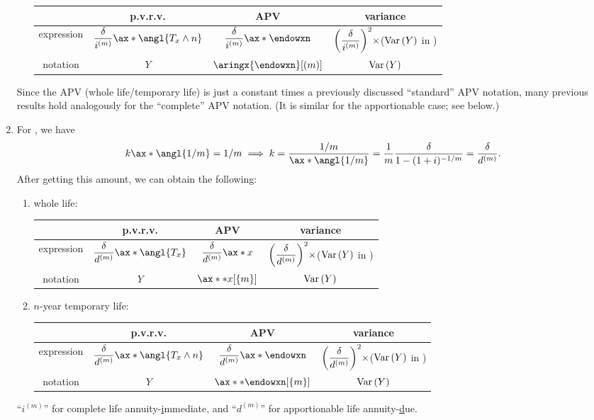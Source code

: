 \begin{enumerate}
\begin{enumerate}
\begin{tabular}{cccc}
\toprule
&p.v.r.v.&APV&variance\\
\midrule
expression&\(\displaystyle \frac{\delta}{i^{(m)}}\ax*{\angl{T_x\wedge n}}\)
&\(\displaystyle \frac{\delta}{i^{(m)}}\ax*{\endowxn}\)
&\(\displaystyle \qty(\frac{\delta}{i^{(m)}})^2\times\)(\(\operatorname{Var}\qty(Y)\) in {it:cts-tmp-annuity-fmlas})\\
notation&\(Y\)&\(\aringx{\endowxn}[(m)]\)&\(\operatorname{Var}\qty(Y)\)\\
\bottomrule
\end{tabular}
\end{enumerate}
\begin{note}
Since the APV (whole life/temporary life) is just a constant times a previously
discussed ``standard'' APV notation, many previous results hold analogously for
the ``complete'' APV notation.  (It is similar for the apportionable case; see
below.)
\end{note}

\item \label{it:apportionable-1m-annuity-fmlas}
For , we have
\[
k\ax*{\angl{1/m}}=1/m
\implies
k=\frac{1/m}{\ax*{\angl{1/m}}}
=\frac{1}{m}\frac{\delta}{1-(1+i)^{-1/m}}
=\frac{\delta}{d^{(m)}}.
\]
After getting this amount, we can obtain the following:
\begin{enumerate}
\item whole life:

\begin{tabular}{cccc}
\toprule
&p.v.r.v.&APV&variance\\
\midrule
expression&\(\displaystyle \frac{\delta}{d^{(m)}}\ax*{\angl{T_x}}\)
&\(\displaystyle \frac{\delta}{d^{(m)}}\ax*{x}\)
&\(\displaystyle \qty(\frac{\delta}{d^{(m)}})^2\times\)(\(\operatorname{Var}\qty(Y)\) in {it:cts-wl-annuity-fmlas})\\
notation&\(Y\)&\(\ax**{x}[\{m\}]\)&\(\operatorname{Var}\qty(Y)\)\\
\bottomrule
\end{tabular}

\item \(n\)-year temporary life:

\begin{tabular}{cccc}
\toprule
&p.v.r.v.&APV&variance\\
\midrule
expression&\(\displaystyle \frac{\delta}{d^{(m)}}\ax*{\angl{T_x\wedge n}}\)
&\(\displaystyle \frac{\delta}{d^{(m)}}\ax*{\endowxn}\)
&\(\displaystyle \qty(\frac{\delta}{d^{(m)}})^2\times\)(\(\operatorname{Var}\qty(Y)\) in {it:cts-tmp-annuity-fmlas})\\
notation&\(Y\)&\(\ax**{\endowxn}[\{m\}]\)&\(\operatorname{Var}\qty(Y)\)\\
\bottomrule
\end{tabular}
\end{enumerate}

\begin{mnemonic}
``\(i^{(m)}\)'' for complete life annuity-\underline{i}mmediate, and
``\(d^{(m)}\)'' for apportionable life annuity-\underline{d}ue.
\end{mnemonic}
\end{enumerate}

